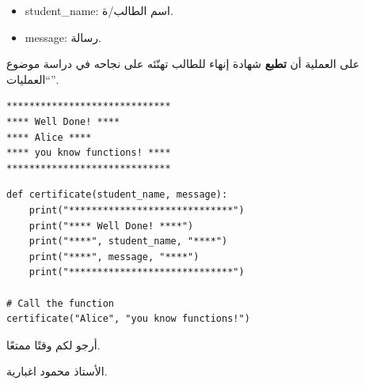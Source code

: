 \documentclass[14pt]{extarticle}
\begin{document}
\begin{enumerate}[resume, label=\textbf{تمرين \arabic*:}, wide=0pt, itemsep=2.2em]
\begin{itemize}[itemsep=0.3em]
\item \textenglish{student\_name}: اسم الطالب/ة.
\item \textenglish{message}: رسالة.
\end{itemize}

على العملية أن \textbf{تطبع} شهادة إنهاء للطالب تهنّئه على نجاحه في دراسة موضوع ``العمليات''.

\ifdetailed
\begin{boxExample}
\begin{english}
\begin{verbatim}
*****************************
**** Well Done! ****
**** Alice ****
**** you know functions! ****
*****************************
\end{verbatim}
\end{english}
\end{boxExample}
\fi

\ifwithsols
\begin{boxSolution}
\begin{english}
\begin{verbatim}
def certificate(student_name, message):
    print("*****************************")
    print("**** Well Done! ****")
    print("****", student_name, "****")
    print("****", message, "****")
    print("*****************************")

# Call the function
certificate("Alice", "you know functions!")
\end{verbatim}
\end{english}
\end{boxSolution}
\fi

\end{enumerate}

\vspace{1cm}
\begin{flushleft}
أرجو لكم وقتًا ممتعًا.

الأستاذ محمود اغبارية.
\end{flushleft}
\end{document}
